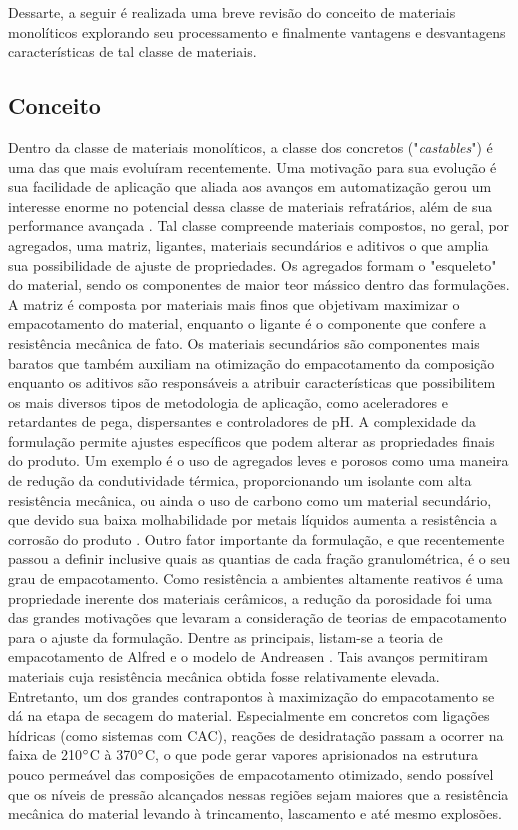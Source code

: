         Dessarte, a seguir é realizada uma breve revisão do conceito de materiais monolíticos explorando seu processamento e finalmente vantagens e desvantagens características de tal classe de materiais.

    \subsection{Conceito}
    
    Dentro da classe de materiais monolíticos, a classe dos concretos ("\textit{castables}") é uma das que mais evoluíram recentemente. Uma motivação para sua evolução é sua facilidade de aplicação que aliada aos avanços em automatização gerou um interesse enorme no potencial dessa classe de materiais refratários, além de sua performance avançada \cite{Schacht2004}. Tal classe compreende materiais compostos, no geral, por agregados, uma matriz, ligantes, materiais secundários e aditivos o que amplia sua possibilidade de ajuste de propriedades.
    Os agregados formam o "esqueleto" do material, sendo os componentes de maior teor mássico dentro das formulações. A matriz é composta por materiais mais finos que objetivam maximizar o empacotamento do material, enquanto o ligante é o componente que confere a resistência mecânica de fato. Os materiais secundários são componentes mais baratos que também auxiliam na otimização do empacotamento da composição enquanto os aditivos são responsáveis a atribuir características que possibilitem os mais diversos tipos de metodologia de aplicação, como aceleradores e retardantes de pega, dispersantes e controladores de pH.
    A complexidade da formulação permite ajustes específicos que podem alterar as propriedades finais do produto. Um exemplo é o uso de agregados leves e porosos como uma maneira de redução da condutividade térmica, proporcionando um isolante com alta resistência mecânica, ou ainda o uso de carbono como um material secundário, que devido sua baixa molhabilidade por metais líquidos aumenta a resistência a corrosão do produto \cite{Schacht2004}.
    Outro fator importante da formulação, e que recentemente passou a definir inclusive quais as quantias de cada fração granulométrica, é o seu grau de empacotamento. Como resistência a ambientes altamente reativos é uma propriedade inerente dos materiais cerâmicos, a redução da porosidade foi uma das grandes motivações que levaram a consideração de teorias de empacotamento para o ajuste da formulação. Dentre as principais, listam-se a teoria de empacotamento de Alfred e o modelo de Andreasen \cite{Ortega1997}. 
    Tais avanços permitiram materiais cuja resistência mecânica obtida fosse relativamente elevada. Entretanto, um dos grandes contrapontos à maximização do empacotamento se dá na etapa de secagem do material. Especialmente em concretos com ligações hídricas (como sistemas com CAC), reações de desidratação passam a ocorrer na faixa de 210$\degree$C à 370$\degree$C, o que pode gerar vapores aprisionados na estrutura pouco permeável das composições de empacotamento otimizado, sendo possível que os níveis de pressão alcançados nessas regiões sejam maiores que a resistência mecânica do material levando à trincamento, lascamento e até mesmo explosões.
    
